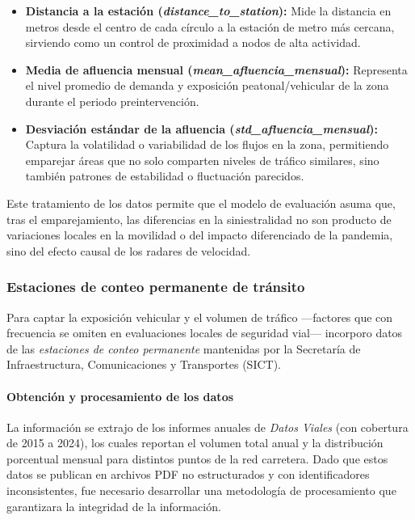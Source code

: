 \begin{itemize}
    \item \textbf{Distancia a la estación (\textit{distance\_to\_station}):} 
    Mide la distancia en metros desde el centro de cada círculo a la estación de metro más cercana, sirviendo como un control de proximidad a nodos de alta actividad.

    \item \textbf{Media de afluencia mensual (\textit{mean\_afluencia\_mensual}):} 
    Representa el nivel promedio de demanda y exposición peatonal/vehicular de la zona durante el periodo preintervención.

    \item \textbf{Desviación estándar de la afluencia (\textit{std\_afluencia\_mensual}):} 
    Captura la volatilidad o variabilidad de los flujos en la zona, permitiendo emparejar áreas que no solo comparten niveles de tráfico similares, sino también patrones de estabilidad o fluctuación parecidos.
\end{itemize}

Este tratamiento de los datos permite que el modelo de evaluación asuma que, tras el emparejamiento, las diferencias en la siniestralidad no son producto de variaciones locales en la movilidad o del impacto diferenciado de la pandemia, sino del efecto causal de los radares de velocidad.

\subsubsection{Estaciones de conteo permanente de tránsito}

Para captar la exposición vehicular y el volumen de tráfico —factores que con frecuencia se omiten en evaluaciones locales de seguridad vial— incorporo datos de las \textit{estaciones de conteo permanente} mantenidas por la Secretaría de Infraestructura, Comunicaciones y Transportes (SICT).

\paragraph{Obtención y procesamiento de los datos}

La información se extrajo de los informes anuales de \textit{Datos Viales} (con cobertura de 2015 a 2024), los cuales reportan el volumen total anual y la distribución porcentual mensual para distintos puntos de la red carretera. Dado que estos datos se publican en archivos PDF no estructurados y con identificadores inconsistentes, fue necesario desarrollar una metodología de procesamiento que garantizara la integridad de la información. 

